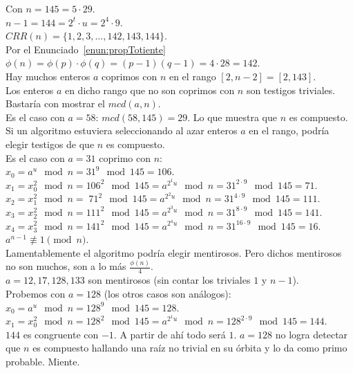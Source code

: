 \begin{ejemplo}
Con $n = 145 = 5 \cdot 29$. \\
$n-1 = 144 = 2^t \cdot u = 2^4 \cdot 9.$ \\
$CRR(n)=\{1,2,3, \dots, 142,143,144\}$. \\
Por el Enunciado~\ref{enun:propTotiente} $\phi(n) = \phi(p) \cdot \phi(q) = (p-1)(q-1)=4 \cdot 28 = 142$. \\
Hay muchos enteros $a$ coprimos con $n$ en el rango $[2,n-2]=[2,143]$. \\
Los enteros $a$ en dicho rango que no son coprimos con $n$ son testigos triviales. Bastaría con mostrar el $mcd(a,n)$. \\
Es el caso con $a=58$: $mcd(58,145)=29$. Lo que muestra que $n$ es compuesto. \\
Si un algoritmo estuviera seleccionando al azar enteros $a$ en el rango, podría elegir testigos de que $n$ es compuesto. \\
Es el caso con $a=31$ coprimo con $n$: \\
$x_0 = a^{u} \mod n =31^{9} \mod 145 = 106$. \\
$x_1 = x_0^{2} \mod n = 106^{2} \mod 145  = a^{2^{1}u} \mod n = 31^{2 \cdot 9} \mod 145 = 71$. \\
$x_2 = x_1^{2} \mod n = \; 71^{2} \mod 145  = a^{2^{2}u} \mod n = 31^{4 \cdot 9} \mod 145 = 111$. \\
$x_3 = x_2^{2} \mod n = 111^{2} \mod 145  = a^{2^{3}u} \mod n = 31^{8 \cdot 9} \mod 145 = 141$. \\
$x_4 = x_3^{2} \mod n = 141^{2} \mod 145  = a^{2^{4}u} \mod n = 31^{16 \cdot 9} \mod 145 = 16$. $a^{n-1} \nequiv 1 \pmod n$. \\
Lamentablemente el algoritmo podría elegir mentirosos. Pero dichos mentirosos no son muchos, son a lo más $\frac{\phi(n)}{4}$. \\
$a=12,17,128,133$ son mentirosos (sin contar los triviales $1$ y $n-1$). \\
Probemos con $a=128$ (los otros casos son análogos): \\
$x_0 = a^{u} \mod n =128^{9} \mod 145 = 128$. \\
$x_1 = x_0^{2} \mod n = 128^{2} \mod 145  = a^{2^{1}u} \mod n = 128^{2 \cdot 9} \mod 145 = 144$. \\
$144$ es congruente con $-1$. A partir de ahí todo será $1$. $a=128$ no logra detectar que $n$ es compuesto hallando una raíz no trivial en su órbita y lo da como primo probable. Miente.\\

\end{ejemplo}
